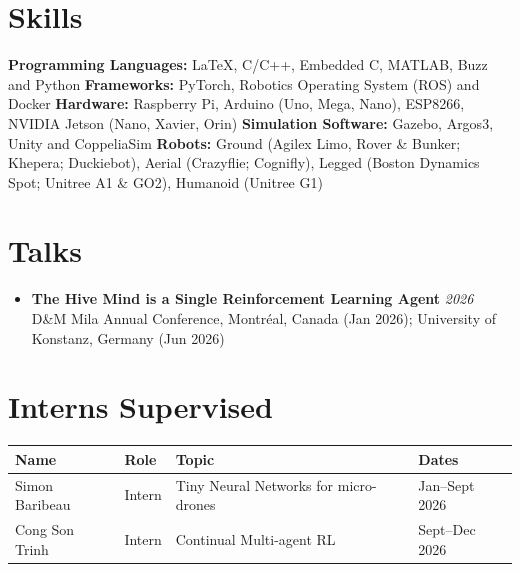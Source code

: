 \documentclass[letterpaper,10pt]{article}
\newenvironment{cvitemize}{
    \begin{itemize}[leftmargin=10pt,label={},afterlabel={},after=\vspace{-12pt}]
}{
    \end{itemize}
}
\begin{document}
\section*{Skills}
\textbf{Programming Languages:} \LaTeX, C/C++, Embedded C, MATLAB, Buzz and Python \newline
\textbf{Frameworks:} PyTorch, Robotics Operating System (ROS) and Docker \newline
\textbf{Hardware:} Raspberry Pi, Arduino (Uno, Mega, Nano), ESP8266, NVIDIA Jetson (Nano, Xavier, Orin) \newline
\textbf{Simulation Software:} Gazebo, Argos3, Unity and CoppeliaSim \newline
\textbf{Robots:} Ground (Agilex Limo, Rover \& Bunker; Khepera; Duckiebot), Aerial (Crazyflie; Cognifly), Legged (Boston Dynamics Spot; Unitree A1 \& GO2), Humanoid (Unitree G1)



\section*{Talks}
\begin{cvitemize}
    \item{
        \textbf{The Hive Mind is a Single Reinforcement Learning Agent} \hfill \textit{2026} \newline
        D\&M Mila Annual Conference, Montréal, Canada (Jan 2026); University of Konstanz, Germany (Jun 2026)
    }
\end{cvitemize}

\section*{Interns Supervised}
\begin{center}
\begin{tabular}{@{}llll@{}}
\textbf{Name} & \textbf{Role} & \textbf{Topic} & \textbf{Dates} \\
\hline
Simon Baribeau & Intern & Tiny Neural Networks for micro-drones & Jan--Sept 2026 \\
Cong Son Trinh & Intern & Continual Multi-agent RL & Sept--Dec 2026 \\
\end{tabular}
\end{center}
\end{document}
